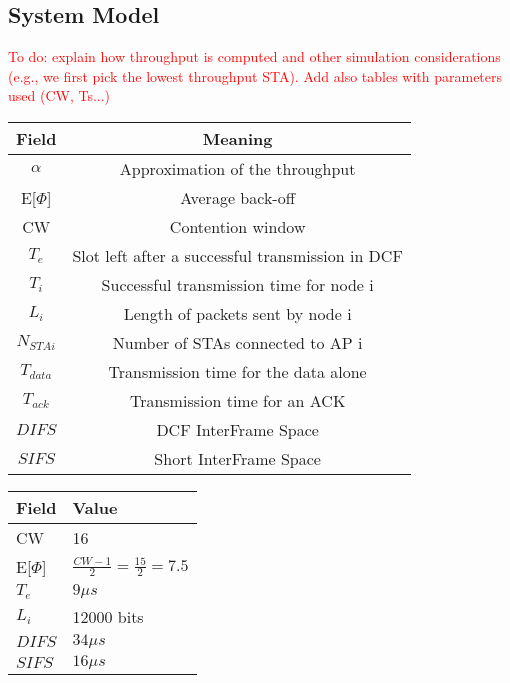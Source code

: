 \documentclass{article}
\begin{document}
	\subsection{System Model}
	\label{section:system_model}
		\textcolor{red}{To do: explain how throughput is computed and other simulation considerations (e.g., we first pick the lowest throughput STA). Add also tables with parameters used (CW, Ts...)}	
	\begin{center}\renewcommand*{\arraystretch}{1.25}
\setlength\tabcolsep{15pt}

\begin{tabular}{|c|c|}


  \hline
  
   \textbf{Field} & \textbf{Meaning}\\ \hline
 $\alpha$  & Approximation of the throughput \\\hline
  E[$\Phi$] & Average back-off\\\hline
  CW & Contention window \\\hline
  $T_e$ & Slot left after a successful transmission in DCF \\\hline
  $T_i$ & Successful transmission time for node i\\\hline
  $L_i$ & Length of packets sent by node i\\\hline
  $N_{STAi}$ & Number of STAs connected to AP i\\\hline
  $T_{data}$ & Transmission time for the data alone\\\hline
  $T_{ack}$ & Transmission time for an ACK\\\hline
  $DIFS$ & DCF InterFrame Space \\\hline
  $SIFS$ & Short InterFrame Space \\\hline


\end{tabular}

\end{center}



\begin{center}\renewcommand*{\arraystretch}{1.25}
\setlength\tabcolsep{15pt}

\begin{tabular}{|P{1cm}|P{7.25cm}|}


  \hline
  
   \textbf{Field} & \textbf{Value}\\ \hline
  CW & 16 \\\hline
   E[$\Phi$] & $\frac{CW-1}{2}=\frac{15}{2}=7.5$ \\\hline
  $T_e$ & $9 \mu s$\\\hline
  $L_i$ & 12000 bits\\\hline
  $DIFS$ & $34 \mu s$\\\hline
  $SIFS$ & $16 \mu s$\\\hline


\end{tabular}

\end{center}
\end{document}
